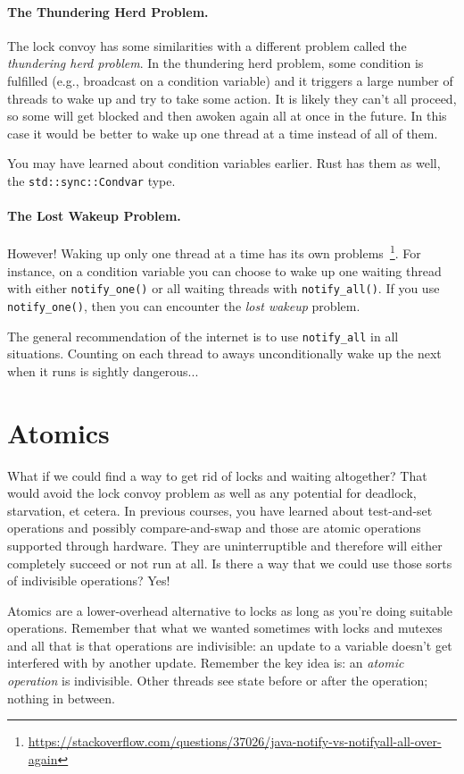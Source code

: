 \documentclass[a4paper]{report}
\begin{document}
\paragraph{The Thundering Herd Problem.} The lock convoy has some similarities with a different problem called the \textit{thundering herd problem}. In the thundering herd problem, some condition is fulfilled (e.g., broadcast on a condition variable) and it triggers a large number of threads to wake up and try to take some action. It is likely they can't all proceed, so some will get blocked and then awoken again all at once in the future. In this case it would be better to wake up one thread at a time instead of all of them.

You may have learned about condition variables earlier. Rust has them as well, the \texttt{std::sync::Condvar} type.

\paragraph{The Lost Wakeup Problem.} However! Waking up only one thread at a time has its own problems~\footnote{\url{https://stackoverflow.com/questions/37026/java-notify-vs-notifyall-all-over-again}}. For instance, on a condition variable you can choose to wake up one waiting thread with either \texttt{notify\_one()} or all waiting threads with \texttt{notify\_all()}. If you use \texttt{notify\_one()}, then you can encounter the \textit{lost wakeup} problem.

The general recommendation of the internet is to use \texttt{notify\_all} in all situations. Counting on each thread to aways unconditionally wake up the next when it runs is sightly dangerous...

\section*{Atomics}
What if we could find a way to get rid of locks and waiting altogether? That would avoid the lock convoy problem as well as any potential for deadlock, starvation, et cetera. In previous courses, you have learned about test-and-set operations and possibly compare-and-swap and those are atomic operations supported through hardware. They are uninterruptible and therefore will either completely succeed or not run at all. Is there a way that we could use those sorts of indivisible operations? Yes!

Atomics are a lower-overhead alternative to
locks as long as you're doing suitable operations. Remember that what we wanted sometimes with locks and mutexes and all that is that operations are indivisible: an update to a variable doesn't get interfered with by another update. Remember the key idea is: an \textit{atomic operation} is indivisible. Other threads see state before or after the operation; nothing in between.
\end{document}
